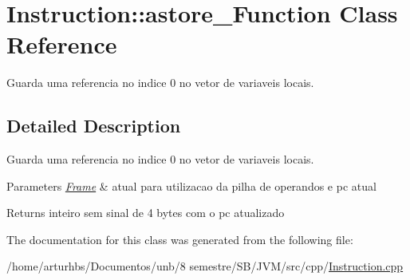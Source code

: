 \hypertarget{classInstruction_1_1astore__0Function}{}\section{Instruction\+:\+:astore\+\_\+Function Class Reference}
\label{classInstruction_1_1astore__0Function}


Guarda uma referencia no indice 0 no vetor de variaveis locais.  




\subsection{Detailed Description}
Guarda uma referencia no indice 0 no vetor de variaveis locais. 


\begin{DoxyParams}{Parameters}
{\em \hyperlink{classFrame}{Frame}} & atual para utilizacao da pilha de operandos e pc atual \\
\hline
\end{DoxyParams}
\begin{DoxyReturn}{Returns}
inteiro sem sinal de 4 bytes com o pc atualizado 
\end{DoxyReturn}


The documentation for this class was generated from the following file\+:\begin{DoxyCompactItemize}
\item 
/home/arturhbs/\+Documentos/unb/8 semestre/\+S\+B/\+J\+V\+M/src/cpp/\hyperlink{Instruction_8cpp}{Instruction.\+cpp}\end{DoxyCompactItemize}
